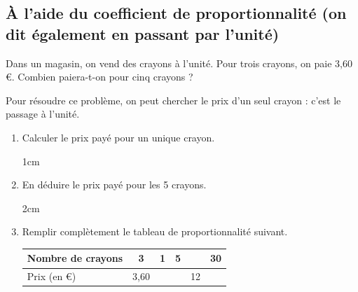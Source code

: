 \documentclass[a4paper]{book}
\begin{document}
\subsection{À l'aide du coefficient de proportionnalité (on dit également en passant par l'unité)}
    \begin{exemple}
        Dans un magasin, on vend des crayons à l'unité. Pour trois crayons, on paie 3,60 €. Combien paiera-t-on pour cinq crayons ?
        
        Pour résoudre ce problème, on peut chercher le prix d'un seul crayon : c'est le passage à l'unité.

        \begin{enumerate}[leftmargin=*]
            \item Calculer le prix payé pour un unique crayon.
            \begin{ZoneReponse}{1cm}
            \end{ZoneReponse}

            \item En déduire le prix payé pour les 5 crayons.
            \begin{ZoneReponse}{2cm}
            \end{ZoneReponse}

            \item Remplir complètement le tableau de proportionnalité suivant.

            \vspace{1cm}
            
            \begin{center}
                \renewcommand{\arraystretch}{1.5}
                \begin{tabular}{|l|c|c|c|c|c|}
                    \hline
                    Nombre de crayons   & 3    & 1   & 5  &    & 30 \\ \hline
                    Prix (en €)         & 3,60 &     &    & 12 &    \\ \hline
                \end{tabular}
            \end{center}            

            \vspace{1cm}
        \end{enumerate}
    \end{exemple}
\end{document}
